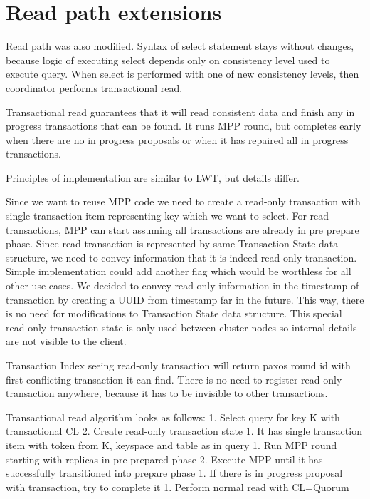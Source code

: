 \section{Read path extensions}
Read path \cite{CassandraReadPath} was also modified. Syntax of select statement stays without changes, because logic of executing select depends only on consistency level used to execute query.  When select is performed with one of new consistency levels, then coordinator performs transactional read.


Transactional read guarantees that it will read consistent data and finish any in progress transactions that can be found. It runs MPP round, but completes early when there are no in progress proposals or when it has repaired all in progress transactions.


Principles of implementation are similar to LWT, but details differ.


Since we want to reuse MPP code we need to create a read-only transaction with single transaction item representing key which we want to select. For read transactions, MPP can start assuming all transactions are already in pre prepare phase. Since read transaction is represented by same Transaction State data structure, we need to convey information that it is indeed read-only transaction. Simple implementation could add another flag which would be worthless for all other use cases. We decided to convey read-only information in the timestamp of transaction by creating a UUID from timestamp far in the future. This way, there is no need for modifications to Transaction State data structure. This special read-only transaction state is only used between cluster nodes so internal details are not visible to the client.


Transaction Index seeing read-only transaction will return paxos round id with first conflicting transaction it can find. There is no need to register read-only transaction anywhere, because it has to be invisible to other transactions.


Transactional read algorithm looks as follows:
1. Select query for key K with transactional CL
2. Create read-only transaction state
   1. It has single transaction item with token from K, keyspace and table as in query
1. Run MPP round starting with replicas in pre prepared phase
2. Execute MPP until it has successfully transitioned into prepare phase
   1. If there is in progress proposal with transaction, try to complete it
1. Perform normal read with CL=Quorum


